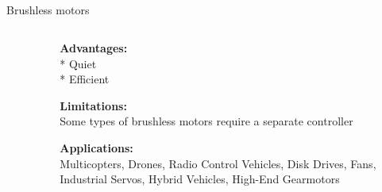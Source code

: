 \subsection{}
{
\begin{frame}{Brushless motors}

\begin{columns}
\begin{column}{0.4\textwidth}  %

	\vspace{-3mm}
   	\begin{figure}
 	\end{figure}

\end{column}

\begin{column}{0.6\textwidth}


{\bf Advantages:} \\
* Quiet \\
* Efficient 

{\bf Limitations:} \\
Some types of brushless motors require a separate controller

{\bf Applications:} \\
Multicopters, 
Drones, 
Radio Control Vehicles, 
Disk Drives,
Fans, 
Industrial Servos, 
Hybrid Vehicles, 
High-End Gearmotors




\end{column}
\end{columns}
\end{frame}
}





